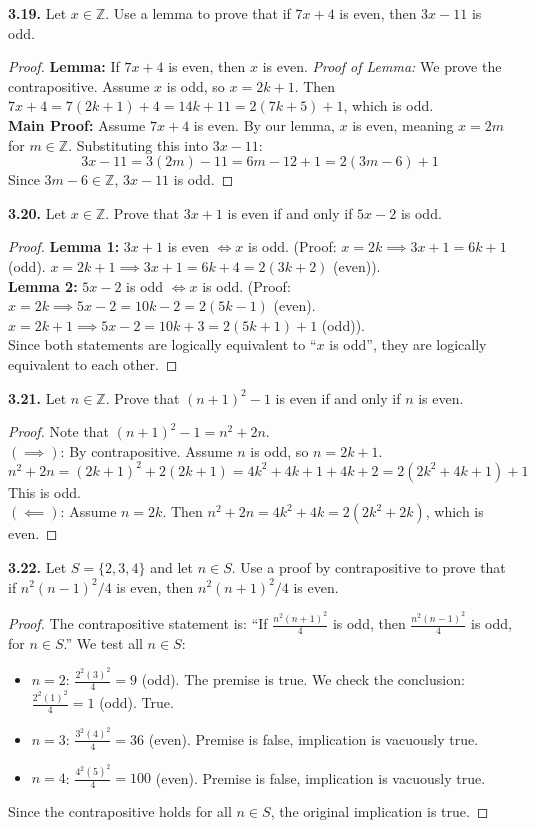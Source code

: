 \documentclass[11pt]{article}
\begin{document}
\textbf{3.19.} Let $x \in \mathbb{Z}$. Use a lemma to prove that if $7x + 4$ is even, then $3x - 11$ is odd.
\begin{proof}
\textbf{Lemma:} If $7x + 4$ is even, then $x$ is even.
\textit{Proof of Lemma:} We prove the contrapositive. Assume $x$ is odd, so $x = 2k + 1$. Then $7x + 4 = 7(2k + 1) + 4 = 14k + 11 = 2(7k + 5) + 1$, which is odd. \\
\textbf{Main Proof:} Assume $7x + 4$ is even. By our lemma, $x$ is even, meaning $x = 2m$ for $m \in \mathbb{Z}$. Substituting this into $3x - 11$:
\[ 3x - 11 = 3(2m) - 11 = 6m - 12 + 1 = 2(3m - 6) + 1 \]
Since $3m - 6 \in \mathbb{Z}$, $3x - 11$ is odd. 
\end{proof}

\textbf{3.20.} Let $x \in \mathbb{Z}$. Prove that $3x + 1$ is even if and only if $5x - 2$ is odd.
\begin{proof}
\textbf{Lemma 1:} $3x+1$ is even $\iff x$ is odd. (Proof: $x=2k \implies 3x+1 = 6k+1$ (odd). $x=2k+1 \implies 3x+1 = 6k+4 = 2(3k+2)$ (even)). \\
\textbf{Lemma 2:} $5x-2$ is odd $\iff x$ is odd. (Proof: $x=2k \implies 5x-2 = 10k-2 = 2(5k-1)$ (even). $x=2k+1 \implies 5x-2 = 10k+3 = 2(5k+1)+1$ (odd)). \\
Since both statements are logically equivalent to ``$x$ is odd'', they are logically equivalent to each other.
\end{proof}

\textbf{3.21.} Let $n \in \mathbb{Z}$. Prove that $(n + 1)^2 - 1$ is even if and only if $n$ is even.
\begin{proof}
Note that $(n + 1)^2 - 1 = n^2 + 2n$. \\
$(\implies)$: By contrapositive. Assume $n$ is odd, so $n = 2k + 1$. 
\[ n^2 + 2n = (2k + 1)^2 + 2(2k + 1) = 4k^2 + 4k + 1 + 4k + 2 = 2(2k^2 + 4k + 1) + 1 \]
This is odd. \\
$(\impliedby)$: Assume $n = 2k$. Then $n^2 + 2n = 4k^2 + 4k = 2(2k^2 + 2k)$, which is even.
\end{proof}

\textbf{3.22.} Let $S = \{2, 3, 4\}$ and let $n \in S$. Use a proof by contrapositive to prove that if $n^2(n - 1)^2/4$ is even, then $n^2(n + 1)^2/4$ is even.
\begin{proof}
The contrapositive statement is: ``If $\frac{n^2(n + 1)^2}{4}$ is odd, then $\frac{n^2(n - 1)^2}{4}$ is odd, for $n \in S$.'' We test all $n \in S$:
\begin{itemize}
    \item $n = 2$: $\frac{2^2(3)^2}{4} = 9$ (odd). The premise is true. We check the conclusion: $\frac{2^2(1)^2}{4} = 1$ (odd). True.
    \item $n = 3$: $\frac{3^2(4)^2}{4} = 36$ (even). Premise is false, implication is vacuously true.
    \item $n = 4$: $\frac{4^2(5)^2}{4} = 100$ (even). Premise is false, implication is vacuously true.
\end{itemize}
Since the contrapositive holds for all $n \in S$, the original implication is true.
\end{proof}
\end{document}
